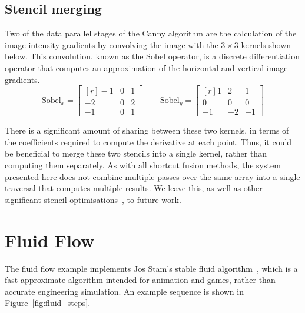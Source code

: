 \subsection{Stencil merging}

Two of the data parallel stages of the Canny algorithm are the calculation of
the image intensity gradients by convolving the image with the $3\times3$
kernels shown below. This convolution, known as the Sobel operator, is a
discrete differentiation operator that computes an approximation of the
horizontal and vertical image gradients.
%
\begin{equation*}
    \text{Sobel}_x =
        \begin{bmatrix*}[r]
          -1 & 0 & 1 \\
          -2 & 0 & 2 \\
          -1 & 0 & 1
        \end{bmatrix*}
    \qquad
    \text{Sobel}_y =
        \begin{bmatrix*}[r]
           1 &  2 &  1 \\
           0 &  0 &  0 \\
          -1 & -2 & -1
        \end{bmatrix*}
\end{equation*}

There is a significant amount of sharing between these two kernels, in terms of
the coefficients required to compute the derivative at each point. Thus, it
could be beneficial to merge these two stencils into a single kernel, rather
than computing them separately. As with all shortcut fusion methods, the system
presented here does not combine multiple passes over the same array into a
single traversal that computes multiple results. We leave this, as well as other
significant stencil
optimisations~\cite{Henretty:2013wb,Kamil:2006un,Lesniak:2010}, to future work.



\section{Fluid Flow}
\label{sec:fluid}

The fluid flow example implements Jos Stam's stable fluid
algorithm~\cite{Stam:1999ey}, which is a fast approximate algorithm intended for
animation and games, rather than accurate engineering simulation. An example
sequence is shown in Figure~\ref{fig:fluid_steps}.

